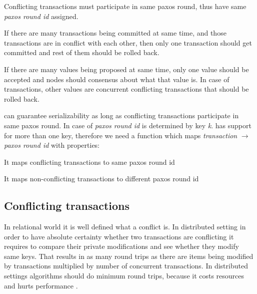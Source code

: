 \begin{definition}
  \label{def:samePaxosStateProperty}
  Conflicting transactions must participate in same paxos round, thus have same \emph{paxos round id} assigned.  
\end{definition}

\begin{definition}
  \label{def:txSerializability}
  If there are many transactions being committed at same time, and those transactions are in conflict with each other, then only one transaction should get committed and rest of them should be rolled back.   
\end{definition}


If there are many values being proposed at same time, only one value should be accepted and nodes should consensus about what that value is. In case of transactions, other values are concurrent conflicting transactions that should be rolled back.

\paxos can guarantee serializability as long as conflicting transactions participate in same paxos round. In case of \lwt \emph{paxos round id} is determined by key \emph{k}. \mpp has support for more than one key, therefore we need a function which maps \emph{transaction} $\rightarrow $ \emph{paxos round id} with properties: 
\begin{enumerate*}
\item It maps conflicting transactions to same paxos round id 
\item It maps non-conflicting transactions to different paxos round id
\end{enumerate*}


\subsection{Conflicting transactions}
In relational world it is well defined what a conflict is. In distributed setting in order to have absolute certainty whether two transactions are conflicting it requires to compare their private modifications and see whether they modify same keys. That results in as many round trips as there are items being modified by transactions multiplied by number of concurrent transactions. In distributed settings algorithms should do minimum round trips, because it costs resources and hurts performance \cite{rotem2006fallacies}.

